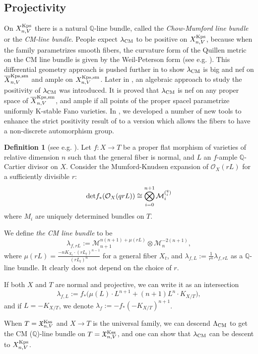 \documentclass[12pt,reqno]{amsart}%
\theoremstyle{definition}
\newtheorem{defn}[thm]{Definition}
\theoremstyle{remark}
\newcommand{\cM}{{\mathcal{M}}}
\newcommand{\cO}{{\mathcal{O}}}
\newcommand{\bQ}{{\mathbb{Q}}}
\begin{document}
\subsection{Projectivity}
On $X^{\rm Kps}_{n,V}$ there is a natural  $\mathbb{Q}$-line bundle, called  the {\it Chow-Mumford line bundle} or the {\it CM-line bundle}. People expect $\lambda_{\rm CM}$  to be positive on  $X^{\rm Kps}_{n,V}$, because when the family parametrizes smooth fibers, the curvature form of the Quillen metric on the CM line bundle is given by the Weil-Peterson form (see e.g. \cite{FS90}). This differential geometry approach is pushed further in \cite{LWX18a} to show $\lambda_{\rm CM}$ is big and nef on $\overline{X}^{\rm Kps, sm}_{n,V}$ and ample on ${X^{\rm Kps, sm}_{n,V}}$. Later in \cite{CP18}, an algebraic approach to study the positivity of $\lambda_{\rm CM}$ was introduced. It is proved that  $\lambda_{\rm CM}$  is nef on any proper space of $\overline{X}^{\rm Kps, sm}_{n,V}$, and ample if all points of the proper spacel parametrize uniformly K-stable Fano varieties.  In \cite{XZ19}, we developed a number of new tools to enhance the strict positivity result of \cite{CP18} to a version which allows the fibers to have a non-discrete automorphism group. 
\begin{defn}[{see e.g. \cite{PT09, LWX18, CP18}}] Let $f : X \to T$ be a
proper flat morphism of varieties of relative dimension $n$ such that the general fiber is normal, and $L$ an $f$-ample $\bQ$-Cartier divisor on $X$. 
Consider the Mumford-Knudsen expansion of $\cO_X(rL)$ for a sufficiently divisible $r$:
$$ {\rm det} f_*(\cO_X (qrL)) \cong \bigotimes^{n+1}_{i=0}\cM^{(^q_i)}_i$$
where $M_i$ are uniquely determined bundles on $T$. 

We define {\it the CM line bundle} to be  
$$\lambda_{f,rL}:= \cM_{n+1}^{n(n+1)+\mu(rL)}\otimes\cM_n^{-2(n+1)},$$
where $\mu(rL)=\frac{-nK_{X_t}\cdot (rL_t)^{n-1}}{(rL_t)^n}$ for a general fiber $X_t$, and $\lambda_{f,L}:=\frac{1}{r^n}\lambda_{f,rL}$ as a $\bQ$-line bundle. It clearly does not depend on the choice of $r$. 

If both $X$ and $T$ are normal and projective, we can write it as an intersection
$$\lambda_{f,L} := f_*\big(\mu(L)\cdot L^{n+1}+ (n + 1)L^n\cdot K_{X/T}\big),$$
and if $L=-K_{X/T}$, we denote $\lambda_{f}:=-f_*(-K_{X/T})^{n+1}$. 

When $T=\mathfrak X^{\rm Kss}_{n,V}$ and $X\to T$ is the universal family, we can descend $\Lambda_{\rm CM}$ to get the CM ($\bQ$)-line bundle on $T=\mathfrak X^{\rm Kss}_{n,V}$, and one can show that $\lambda_{\rm CM}$ can be descent to $X^{\rm Kps}_{n,V}$. 
 \end{defn}
\end{document}
